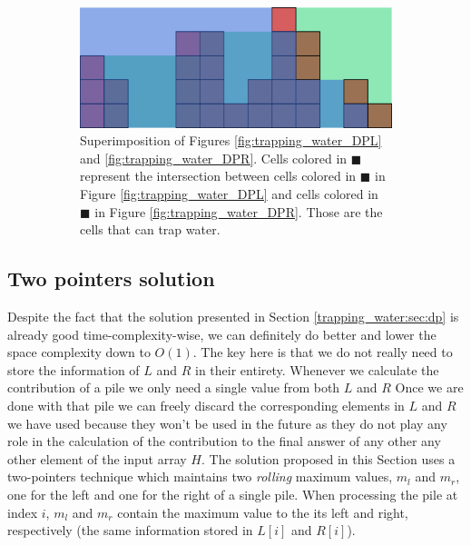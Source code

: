 \begin{figure}
\begin{subfigure}[b]{0.95\textwidth}
   \includegraphics[width=1\linewidth]{sources/trapping_water/images/DPLR}
   \caption{Superimposition of Figures \ref{fig:trapping_water_DPL} and \ref{fig:trapping_water_DPR}. Cells colored in \textcolor[HTML]{5aa1c7}{$\blacksquare$} represent the intersection between cells colored in \textcolor[HTML]{3268d5}{$\blacksquare$} in Figure \ref{fig:trapping_water_DPL} and cells colored in \textcolor[HTML]{32d579}{$\blacksquare$} in Figure \ref{fig:trapping_water_DPR}. Those are the cells that can trap water.}
   \label{fig:trapping_water_DPRL}
\end{subfigure}
\caption{}
\label{fig:trapping_water:dprl_main}
\end{figure}



\subsection{Two pointers solution}
\label{trapping_water:sec:two_pointers}
Despite the fact that the solution presented in Section \ref{trapping_water:sec:dp} is already good time-complexity-wise, we can definitely do better and lower the space complexity down to $O(1)$.
The key here is that we do not really need to store the information of $L$ and $R$ in their entirety.
Whenever we calculate the contribution of a pile  we only need a single value from both $L$ and $R$
Once we are done with that pile we can freely discard the corresponding elements in $L$ and $R$ we have used because they won't be used in the future as they do not play any role in the calculation of the contribution to the final answer of any other any other element of the input array $H$.
The solution proposed in this Section uses a two-pointers technique which maintains two \textit{rolling} maximum values, $m_l$ and $m_r$, one for the left and one for the right of a single pile.
When processing the pile at index $i$, $m_l$ and $m_r$ contain the maximum value to the its left and right, respectively (the same information stored in $L[i]$ and $R[i]$).

